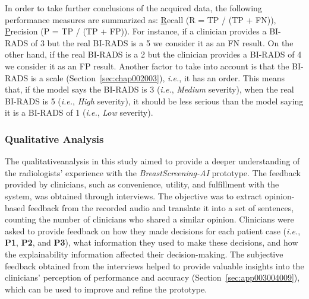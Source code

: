 In order to take further conclusions of the acquired data, the following performance measures are summarized as: \underline{R}ecall (R = \ac{TP} / (\ac{TP} + \ac{FN})), \underline{P}recision (P = \ac{TP} / (\ac{TP} + \ac{FP})).
For instance, if a clinician provides a \ac{BI-RADS} of 3 but the real \ac{BI-RADS} is a 5 we consider it as an \ac{FN} result.
On the other hand, if the real \ac{BI-RADS} is a 2 but the clinician provides a \ac{BI-RADS} of 4 we consider it as an \ac{FP} result.
Another factor to take into account is that the \ac{BI-RADS} is a scale (Section~\ref{sec:chap002003}), {\it i.e.}, it has an order.
This means that, if the model says the \ac{BI-RADS} is 3 ({\it i.e.}, {\it Medium} severity), when the real \ac{BI-RADS} is 5 ({\it i.e.}, {\it High} severity), it should be less serious than the model saying it is a \ac{BI-RADS} of 1 ({\it i.e.}, {\it Low} severity).

\subsubsection{Qualitative Analysis}
\label{sec:chap005005004002}

The qualitative\footnotemark[14] analysis in this study aimed to provide a deeper understanding of the radiologists' experience with the {\it BreastScreening-AI} prototype.
The feedback provided by clinicians, such as convenience, utility, and fulfillment with the system, was obtained through interviews.
The objective was to extract opinion-based feedback from the recorded audio and translate it into a set of sentences, counting the number of clinicians who shared a similar opinion.
Clinicians were asked to provide feedback on how they made decisions for each patient case ({\it i.e.}, {\bf P1}, {\bf P2}, and {\bf P3}), what information they used to make these decisions, and how the explainability information affected their decision-making.
The subjective feedback obtained from the interviews helped to provide valuable insights into the clinicians' perception of performance and accuracy (Section~\ref{sec:app003004009}), which can be used to improve and refine the prototype.


